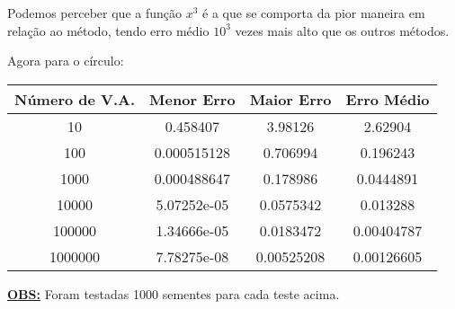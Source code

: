\documentclass[12pt]{article}
\newcommand{\mytitle}[1]{\textbf{\underline{#1}}}
\begin{document}
Podemos perceber que a função $x^3$ é a que se comporta da pior maneira em relação ao método, tendo erro médio $10^3$ vezes mais alto que os outros métodos.

\newpage

Agora para o círculo:

\begin{center}
  \begin{tabular}{||c | c | c | c ||}
    \hline
    Número de V.A. & Menor Erro & Maior Erro & Erro Médio \\ [0.5ex]
    \hline\hline
    10 & 0.458407 & 3.98126 & 2.62904 \\
    \hline
    100 & 0.000515128 & 0.706994 & 0.196243 \\
    \hline
    1000 & 0.000488647 & 0.178986 & 0.0444891 \\
    \hline
    10000 & 5.07252e-05 & 0.0575342 & 0.013288 \\
    \hline
    100000 & 1.34666e-05 & 0.0183472 & 0.00404787 \\
    \hline
    1000000 & 7.78275e-08 & 0.00525208 & 0.00126605 \\
    \hline
  \end{tabular}
\end{center}



\mytitle{OBS:} Foram testadas 1000 sementes para cada teste acima.
\end{document}
